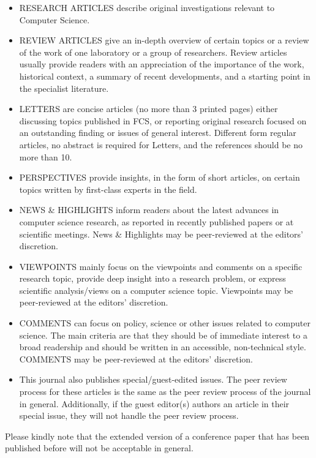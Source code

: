 \documentclass[review]{fcs}
\begin{document}
\begin{itemize}
\item RESEARCH ARTICLES describe original investigations relevant to Computer Science.
\item REVIEW ARTICLES give an in-depth over\-view of certain topics or a review of the work of one laboratory or a group of researchers. Review articles usually provide readers with an appreciation of the importance of the work, historical context, a summary of recent developments, and a starting point in the specialist literature.
\item LETTERS are concise articles (no more than 3 printed pages) either discussing topics published in FCS, or reporting original research focused on an outstanding finding or issues of general interest. Different form regular articles, no abstract is required for Letters, and the references should be no more than 10.
\item PERSPECTIVES provide insights, in the form of short articles, on certain topics written by first-class experts in the field.
\item NEWS \& HIGHLIGHTS inform readers about the latest advances in computer science research, as reported in recently published papers or at scientific meetings. News \& Highlights may be peer-reviewed at the editors' discretion.
\item VIEWPOINTS mainly focus on the viewpoints and comments on a specific research topic, provide deep insight into a research problem, or express scientific analysis/views on a computer science topic. Viewpoints may be peer-reviewed at the editors' discretion.
\item COMMENTS can focus on policy, science or other issues related to computer science. The main criteria are that they should be of immediate interest to a broad readership and should be written in an accessible, non-technical style. COMMENTS may be peer-reviewed at the editors' discretion.
\item This journal also publishes special/guest-edited issues. The peer review process for these articles is the same as the peer review process of the journal in general. Additionally, if the guest editor(s) authors an article in their special issue, they will not handle the peer review process.
\end{itemize}

Please kindly note that the extended version of a conference paper that has been published before will not be acceptable in general.
\end{document}
